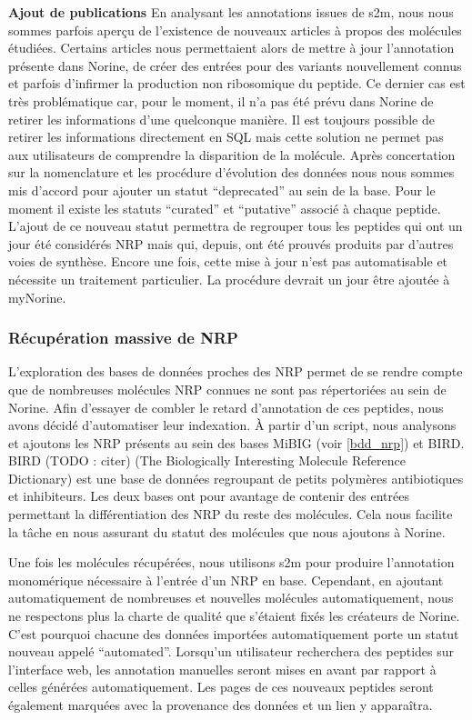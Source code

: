 \textbf{Ajout de publications} 
En analysant les annotations issues de s2m, nous nous sommes parfois aperçu de l'existence de nouveaux articles à propos des molécules étudiées.
Certains articles nous permettaient alors de mettre à jour l'annotation présente dans Norine, de créer des entrées pour des variants nouvellement connus et parfois d'infirmer la production non ribosomique du peptide.
Ce dernier cas est très problématique car, pour le moment, il n'a pas été prévu dans Norine de retirer les informations d'une quelconque manière.
Il est toujours possible de retirer les informations directement en SQL mais cette solution ne permet pas aux utilisateurs de comprendre la disparition de la molécule.
Après concertation sur la nomenclature et les procédure d'évolution des données nous nous sommes mis d'accord pour ajouter un statut ``deprecated'' au sein de la base.
Pour le moment il existe les statuts ``curated'' et ``putative'' associé à chaque peptide.
L'ajout de ce nouveau statut permettra de regrouper tous les peptides qui ont un jour été considérés NRP mais qui, depuis, ont été prouvés produits par d'autres voies de synthèse.
Encore une fois, cette mise à jour n'est pas automatisable et nécessite un traitement particulier.
La procédure devrait un jour être ajoutée à myNorine.


\subsubsection{Récupération massive de NRP}

L'exploration des bases de données proches des NRP permet de se rendre compte que de nombreuses molécules NRP connues ne sont pas répertoriées au sein de Norine.
Afin d'essayer de combler le retard d'annotation de ces peptides, nous avons décidé d'automatiser leur indexation.
À partir d'un script, nous analysons et ajoutons les NRP présents au sein des bases MiBIG (voir \ref{bdd_nrp}) et BIRD.
BIRD (TODO : citer) (The Biologically Interesting Molecule Reference Dictionary) est une base de données regroupant de petits polymères antibiotiques et inhibiteurs.
Les deux bases ont pour avantage de contenir des entrées permettant la différentiation des NRP du reste des molécules.
Cela nous facilite la tâche en nous assurant du statut des molécules que nous ajoutons à Norine.

Une fois les molécules récupérées, nous utilisons s2m pour produire l'annotation monomérique nécessaire à l'entrée d'un NRP en base.
Cependant, en ajoutant automatiquement de nombreuses et nouvelles molécules automatiquement, nous ne respectons plus la charte de qualité que s'étaient fixés les créateurs de Norine.
C'est pourquoi chacune des données importées automatiquement porte un statut nouveau appelé ``automated''.
Lorsqu'un utilisateur recherchera des peptides sur l'interface web, les annotation manuelles seront mises en avant par rapport à celles générées automatiquement.
Les pages de ces nouveaux peptides seront également marquées avec la provenance des données et un lien y apparaîtra.

